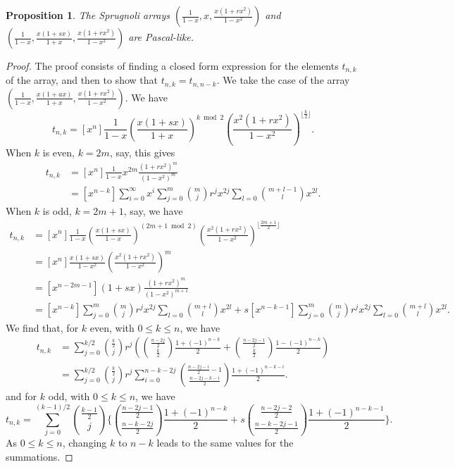 \documentclass[10pt,a4paper]{amsart}
\newtheorem{proposition}[theorem]{Proposition}
\begin{document}
\begin{proposition} The Sprugnoli arrays $\left(\frac{1}{1-x}, x, \frac{x(1+rx^2)}{1-x^2}\right)$ and $\left(\frac{1}{1-x}, \frac{x(1+sx)}{1+x}, \frac{x(1+rx^2)}{1-x^2}\right)$ are Pascal-like.
\end{proposition}

\begin{proof} The proof consists of finding a closed form expression for the elements $t_{n,k}$ of the array, and then to show that $t_{n,k}=t_{n,n-k}$. We take the case of the array $\left(\frac{1}{1-x}, \frac{x(1+ax)}{1+x}, \frac{x(1+rx^2)}{1-x^2}\right)$. We have
$$t_{n,k}=[x^n]\frac{1}{1-x}\left(\frac{x(1+sx)}{1+x}\right)^{k \bmod 2}\left(\frac{x^2(1+rx^2)}{1-x^2}\right)^{\lfloor \frac{k}{2} \rfloor}.$$
When $k$ is even, $k=2m$, say, this gives
\begin{align*}
t_{n,k}&=[x^n]\frac{1}{1-x} x^{2m}\frac{(1+rx^2)^m}{(1-x^2)^m}\\
&=[x^{n-k}] \sum_{i=0}^{\infty}x^i \sum_{j=0}^m \binom{m}{j}r^jx^{2j}\sum_{l=0} \binom{m+l-1}{l}x^{2l}.\end{align*}
When $k$ is odd, $k=2m+1$, say, we have
\begin{align*}
t_{n,k}&=[x^n]\frac{1}{1-x}\left(\frac{x(1+sx)}{1-x}\right)^{(2m+1 \bmod 2)}\left(\frac{x^2(1+rx^2)}{1-x^2}\right)^{\lfloor \frac{2m+1}{2} \rfloor}\\
&=[x^n]\frac{x(1+sx)}{1-x^2}\left(\frac{x^2(1+rx^2)}{1-x^2}\right)^m\\
&=[x^{n-2m-1}](1+sx) \frac{(1+rx^2)^m}{(1-x^2)^{m+1}}\\
&=[x^{n-k}] \sum_{j=0}^m \binom{m}{j}r^jx^{2j} \sum_{l=0}\binom{m+l}{l}x^{2l}+s[x^{n-k-1}] \sum_{j=0}^m \binom{m}{j}r^jx^{2j} \sum_{l=0}\binom{m+l}{l}x^{2l}.\end{align*}
We find that, for $k$ even, with $0\le k\le n$, we have
\begin{align*}t_{n,k}&=\sum_{j=0}^{k/2} \binom{\frac{k}{2}}{j}r^j\left(\binom{\frac{n-2j}{2}}{\frac{k}{2}}\frac{1+(-1)^{n-k}}{2}+\binom{\frac{n-2j-1}{2}}{\frac{k}{2}}\frac{1-(-1)^{n-k}}{2}\right)\\
&=\sum_{j=0}^{k/2}\binom{\frac{k}{2}}{j}r^j \sum_{i=0}^{n-k-2j} \binom{\frac{n-2j-i}{2}-1}{\frac{n-2j-k-i}{2}}\frac{1+(-1)^{n-k-i}}{2}.\end{align*}
and for $k$ odd, with $0\le k\le n$, we have
$$t_{n,k}=\sum_{j=0}^{(k-1)/2}\binom{\frac{k-1}{2}}{j}\{\binom{\frac{n-2j-1}{2}}{\frac{n-k-2j}{2}}\frac{1+(-1)^{n-k}}{2}+s\binom{\frac{n-2j-2}{2}}{\frac{n-k-2j-1}{2}}\frac{1+(-1)^{n-k-1}}{2}\}.$$
As $0\le k \le n$, changing $k$ to $n-k$ leads to the same values for the summations.
\end{proof}
\end{document}
